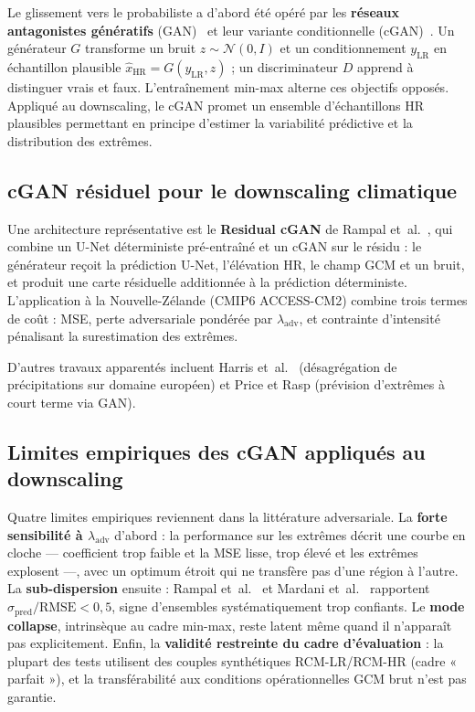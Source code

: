 \documentclass[14pt,a4paper,openany]{extreport}
\newcommand{\LR}{\ensuremath{\text{LR}}}
\newcommand{\HR}{\ensuremath{\text{HR}}}
\newcommand{\yLR}{\ensuremath{y_{\LR}}}
\begin{document}
Le glissement vers le probabiliste a d'abord été opéré par les \textbf{réseaux antagonistes génératifs} (GAN)~\cite{goodfellow_gan_2014} et leur variante conditionnelle (cGAN)~\cite{mirza_cgan_2014}. Un générateur $G$ transforme un bruit $z \sim \mathcal{N}(0,I)$ et un conditionnement $\yLR$ en échantillon plausible $\hat{x}_{\HR} = G(\yLR, z)$ ; un discriminateur $D$ apprend à distinguer vrais et faux. L'entraînement min-max alterne ces objectifs opposés. Appliqué au downscaling, le cGAN promet un ensemble d'échantillons HR plausibles permettant en principe d'estimer la variabilité prédictive et la distribution des extrêmes.

\subsection{cGAN résiduel pour le downscaling climatique}
\label{ssec:soa-rampal}

Une architecture représentative est le \textbf{Residual cGAN} de Rampal et~al.~\cite{rampal_cgan_2024}, qui combine un U-Net déterministe pré-entraîné et un cGAN sur le résidu : le générateur reçoit la prédiction U-Net, l'élévation HR, le champ GCM et un bruit, et produit une carte résiduelle additionnée à la prédiction déterministe. L'application à la Nouvelle-Zélande (CMIP6 ACCESS-CM2) combine trois termes de coût : MSE, perte adversariale pondérée par $\lambda_{\mathrm{adv}}$, et contrainte d'intensité pénalisant la surestimation des extrêmes.

D'autres travaux apparentés incluent Harris et~al.~\cite{harris_2022} (désagrégation de précipitations sur domaine européen) et Price et Rasp (prévision d'extrêmes à court terme via GAN).

\subsection{Limites empiriques des cGAN appliqués au downscaling}
\label{ssec:soa-cgan-limites}

Quatre limites empiriques reviennent dans la littérature adversariale. La \textbf{forte sensibilité à $\lambda_{\mathrm{adv}}$} d'abord : la performance sur les extrêmes décrit une courbe en cloche --- coefficient trop faible et la MSE lisse, trop élevé et les extrêmes explosent ---, avec un optimum étroit qui ne transfère pas d'une région à l'autre. La \textbf{sub-dispersion} ensuite : Rampal et~al.~\cite{rampal_cgan_2024} et Mardani et~al.~\cite{mardani_corrdiff_2023} rapportent $\sigma_{\mathrm{pred}}/\mathrm{RMSE} < 0{,}5$, signe d'ensembles systématiquement trop confiants. Le \textbf{mode collapse}, intrinsèque au cadre min-max, reste latent même quand il n'apparaît pas explicitement. Enfin, la \textbf{validité restreinte du cadre d'évaluation} : la plupart des tests utilisent des couples synthétiques RCM-LR/RCM-HR (cadre « parfait »), et la transférabilité aux conditions opérationnelles GCM brut n'est pas garantie.
\end{document}
